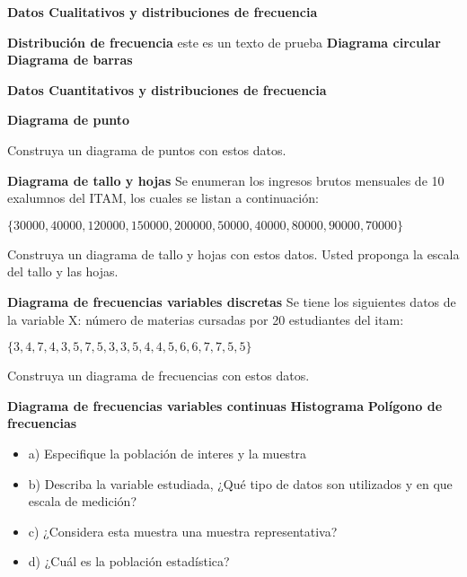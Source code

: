 \documentclass{oxmathproblems}
\begin{document}
\begin{questions}

\miquestion \textbf{Datos Cualitativos y distribuciones de frecuencia}

\textbf{Distribución de frecuencia}
este es un texto de prueba 
\textbf{Diagrama circular}
\textbf{Diagrama de barras}

\miquestion \textbf{Datos Cuantitativos y distribuciones de frecuencia}

\textbf{Diagrama de punto}

Construya un diagrama de puntos con estos datos.

\textbf{Diagrama de tallo y hojas}
Se enumeran los ingresos brutos mensuales de 10 exalumnos del ITAM, los cuales se listan a continuación:

$\{30000, 40000, 120000, 150000, 200000, 50000, 40000, 80000, 90000, 70000\}$

Construya un diagrama de tallo y hojas con estos datos. Usted proponga la escala del tallo y las hojas.


\textbf{Diagrama de frecuencias variables discretas}
Se tiene los siguientes datos de la variable X: número de materias cursadas por 20 estudiantes del itam:

$\{3,4,7,4,3,5,7,5,3,3,5,4,4,5,6,6,7,7,5,5\}$

Construya un diagrama de frecuencias con estos datos.

\textbf{Diagrama de frecuencias variables continuas}
\textbf{Histograma}
\textbf{Polígono de frecuencias}



\begin{itemize}
\item a) Especifique la población de interes y la muestra
\item b) Describa la variable estudiada, ¿Qué tipo de datos son utilizados y en que escala de medición?
\item c) ¿Considera esta muestra una muestra representativa?
\item d) ¿Cuál es la población estadística?
\end{itemize}

\end{questions}
\end{document}

